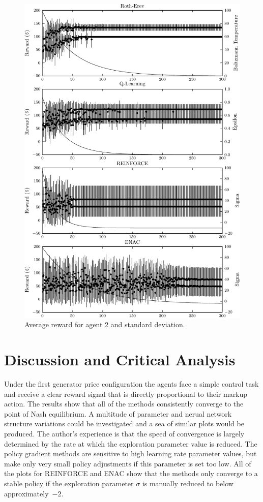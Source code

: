 \begin{figure}
  \centering
  \includegraphics{figures/fig5_2_reward_a2}
  \caption{Average reward for agent 2 and standard deviation.}
  \label{fig:5_2_reward_a2}
\end{figure}

\section{Discussion and Critical Analysis}
Under the first generator price configuration the agents face a simple
control task and receive a clear reward signal that is directly proportional to
their markup action.  The results show that all of the methods consistently
converge to the point of Nash equilibrium.  A multitude of parameter and nerual
network structure variations could be investigated and a sea of similar
plots would be produced.  The author's experience is that the speed of
convergence is largely determined by the rate at which the exploration parameter value is reduced.
The policy gradient methods are sensitive to high learning rate parameter
values, but make only very small policy adjustments if this parameter is set
too low. All of the plots for REINFORCE and ENAC show that the methods only converge to a
stable policy if the exploration parameter $\sigma$ is manually reduced to
below approximately~$-2$.

